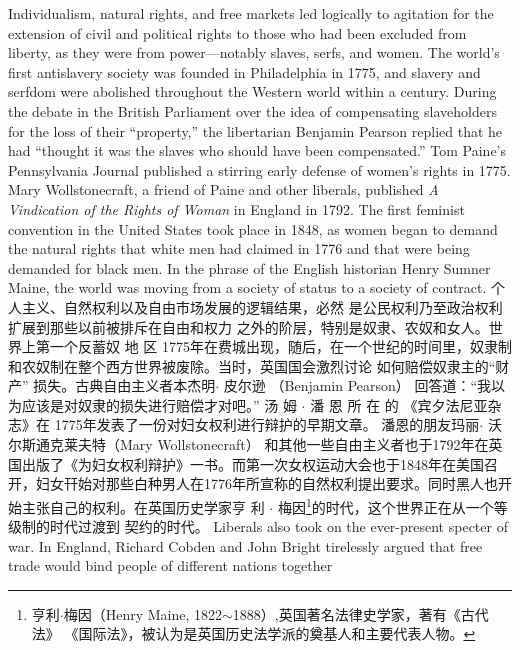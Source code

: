 \begin{paracol}{2}
Individualism, natural rights, and free markets led logically to
agitation for the extension of civil and political rights to those
who had been excluded from liberty, as they were from
power---notably slaves, serfs, and women. The world's first antislavery society was founded in Philadelphia in 1775, and slavery and serfdom were abolished throughout the Western world within a century. During the debate in the British Parliament
over the idea of compensating slaveholders for the loss of their
``property,'' the libertarian Benjamin Pearson replied that he
had ``thought it was the slaves who should have been compensated.'' Tom Paine's Pennsylvania Journal published a stirring
early defense of women's rights in 1775. Mary Wollstonecraft, a
friend of Paine and other liberals, published \textit{A Vindication of the
Rights of Woman} in England in 1792. The first feminist convention in the United States took place in 1848, as women began
to demand the natural rights that white men had claimed in
1776 and that were being demanded for black men. In the
phrase of the English historian Henry Sumner Maine, the world
was moving from a society of status to a society of contract.
\switchcolumn
个人主义、自然权利以及自由市场发展的逻辑结果，必然
是公民权利乃至政治权利扩展到那些以前被排斥在自由和权力
之外的阶层，特别是奴隶、农奴和女人。世界上第一个反蓄奴
地 区 1775年在费城出现，随后，在一个世纪的时间里，奴隶制和农奴制在整个西方世界被废除。当时，英国国会激烈讨论
如何赔偿奴隶主的“财产” 损失。古典自由主义者本杰明$\cdot$
皮尔逊 （Benjamin  Pearson） 回答道：“我以为应该是对奴隶的损失进行赔偿才对吧。” 汤 姆 $\cdot$ 潘 恩 所 在 的 《宾夕法尼亚杂志》在 1775年发表了一份对妇女权利进行辩护的早期文章。
潘恩的朋友玛丽$\cdot$ 沃尔斯通克莱夫特（Mary  Wollstonecraft）
和其他一些自由主义者也于1792年在英国出版了《为妇女权利辩护》一书。而第一次女权运动大会也于1848年在美国召
开，妇女幵始对那些白种男人在1776年所宣称的自然权利提出要求。同时黑人也开始主张自己的权利。在英国历史学家亨
利 $\cdot$ 梅因\footnote{亨利$\cdot$梅因（Henry Maine, 1822$\sim$1888）,英国著名法律史学家，著有《古代法》 《国际法》，被认为是英国历史法学派的奠基人和主要代表人物。}的时代，这个世界正在从一个等级制的时代过渡到
契约的时代。  
\switchcolumn*
Liberals also took on the ever-present specter of war. In England, Richard Cobden and John Bright tirelessly argued that
free trade would bind people of different nations together

\end{paracol}
